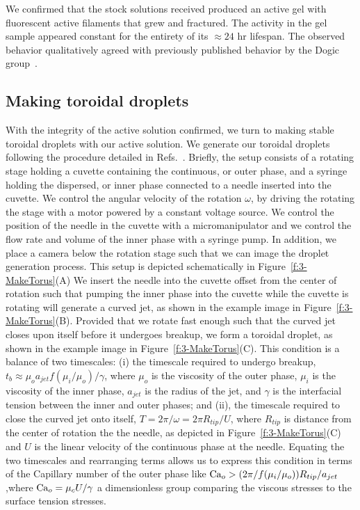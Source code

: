 We confirmed that the stock solutions received produced an active gel with fluorescent active filaments that grew and fractured.
The activity in the gel sample appeared constant for the entirety of its  $\approx 24$ hr lifespan.
The observed behavior qualitatively agreed with previously published behavior by the Dogic group~\cite{RN3}.


\subsection{Making toroidal droplets}
With the integrity of the active solution confirmed, we turn to making stable toroidal droplets with our active solution.
We generate our toroidal droplets following the procedure detailed in Refs.~\cite{RN29,RN47,RN257}.
Briefly, the setup consists of a rotating stage holding a cuvette containing the continuous, or outer phase, and a syringe holding the dispersed, or inner phase connected to a needle inserted into the cuvette.
We control the angular velocity of the rotation $\omega$, by driving the rotating the stage with a motor powered by a constant voltage source.
We control the position of the needle in the cuvette with a micromanipulator and we control the flow rate and volume of the inner phase with a syringe pump.
In addition, we place a camera below the rotation stage such that we can image the droplet generation process.
This setup is depicted schematically in Figure~\ref{f:3-MakeTorus}(A)
We insert the needle into the cuvette offset from the center of rotation such that pumping the inner phase into the cuvette while the cuvette is rotating will generate a curved jet, as shown in the example image in Figure~\ref{f:3-MakeTorus}(B).
Provided that we rotate fast enough such that the curved jet closes upon itself before it undergoes breakup, we form a toroidal droplet, as shown in the example image in Figure~\ref{f:3-MakeTorus}(C).
This condition is a balance of two timescales: (i) the timescale required to undergo breakup, $t_b \approx \mu_o a_{jet} f(\mu_i/\mu_o)/\gamma$, where $\mu_o$ is the viscosity of the outer phase, $\mu_i$ is the viscosity of the inner phase, $a_{jet}$ is the radius of the jet, and $\gamma$ is the interfacial tension between the inner and outer phases;
  and (ii), the timescale required to close the curved jet onto itself, $T = 2\pi/\omega = 2 \pi R_{tip}/U$, where $R_{tip}$ is distance from the center of rotation the the needle, as depicted in Figure~\ref{f:3-MakeTorus}(C) and $U$ is the linear velocity of the continuous phase at the needle.
Equating the two timescales and rearranging terms allows us to express this condition in terms of the Capillary number of the outer phase like $\textup{Ca}_o > (2 \pi / f(\mu_i/\mu_o))R_{tip}/a_{jet}$ ,where $\textup{Ca}_o = \mu_c U/\gamma$ a dimensionless group comparing the viscous stresses to the surface tension stresses.

